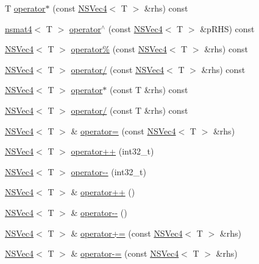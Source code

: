 \begin{DoxyCompactItemize}
\item 
T \hyperlink{structNSVec4_af222a7cc03f71887f77c29b531976b4a}{operator$\ast$} (const \hyperlink{structNSVec4}{N\-S\-Vec4}$<$ T $>$ \&rhs) const 
\item 
\hyperlink{structnsmat4}{nsmat4}$<$ T $>$ \hyperlink{structNSVec4_a7c060701ea7b291e6d1ba966f8c292f9}{operator$^\wedge$} (const \hyperlink{structNSVec4}{N\-S\-Vec4}$<$ T $>$ \&p\-R\-H\-S) const 
\item 
\hyperlink{structNSVec4}{N\-S\-Vec4}$<$ T $>$ \hyperlink{structNSVec4_a9f5e48c37b06d892b2dc8dee261dfcd3}{operator\%} (const \hyperlink{structNSVec4}{N\-S\-Vec4}$<$ T $>$ \&rhs) const 
\item 
\hyperlink{structNSVec4}{N\-S\-Vec4}$<$ T $>$ \hyperlink{structNSVec4_a58e3a1e08ffe5753c32d5335da0cf4a7}{operator/} (const \hyperlink{structNSVec4}{N\-S\-Vec4}$<$ T $>$ \&rhs) const 
\item 
\hyperlink{structNSVec4}{N\-S\-Vec4}$<$ T $>$ \hyperlink{structNSVec4_afd721127de77da40cdce780d387eb217}{operator$\ast$} (const T \&rhs) const 
\item 
\hyperlink{structNSVec4}{N\-S\-Vec4}$<$ T $>$ \hyperlink{structNSVec4_a228ee4bdcd40a831502c753969782b15}{operator/} (const T \&rhs) const 
\item 
\hyperlink{structNSVec4}{N\-S\-Vec4}$<$ T $>$ \& \hyperlink{structNSVec4_aca4854f7387f9ee92b165e0edbd7999a}{operator=} (const \hyperlink{structNSVec4}{N\-S\-Vec4}$<$ T $>$ \&rhs)
\item 
\hyperlink{structNSVec4}{N\-S\-Vec4}$<$ T $>$ \hyperlink{structNSVec4_afc4757122ea8dbc235d9fc35d39a20d4}{operator++} (int32\-\_\-t)
\item 
\hyperlink{structNSVec4}{N\-S\-Vec4}$<$ T $>$ \hyperlink{structNSVec4_a5beef989611a7a179688e0d3f1d86261}{operator-\/-\/} (int32\-\_\-t)
\item 
\hyperlink{structNSVec4}{N\-S\-Vec4}$<$ T $>$ \& \hyperlink{structNSVec4_a646f16b05529a4f2648a9f7342ae9e7e}{operator++} ()
\item 
\hyperlink{structNSVec4}{N\-S\-Vec4}$<$ T $>$ \& \hyperlink{structNSVec4_a008c0638f95d327a277facb00f0addf5}{operator-\/-\/} ()
\item 
\hyperlink{structNSVec4}{N\-S\-Vec4}$<$ T $>$ \& \hyperlink{structNSVec4_ad5cb916c5c566c3af96944748dcd5e6e}{operator+=} (const \hyperlink{structNSVec4}{N\-S\-Vec4}$<$ T $>$ \&rhs)
\item 
\hyperlink{structNSVec4}{N\-S\-Vec4}$<$ T $>$ \& \hyperlink{structNSVec4_aceef8b7200c3822f5c7911345bc55c7d}{operator-\/=} (const \hyperlink{structNSVec4}{N\-S\-Vec4}$<$ T $>$ \&rhs)

\end{DoxyCompactItemize}
